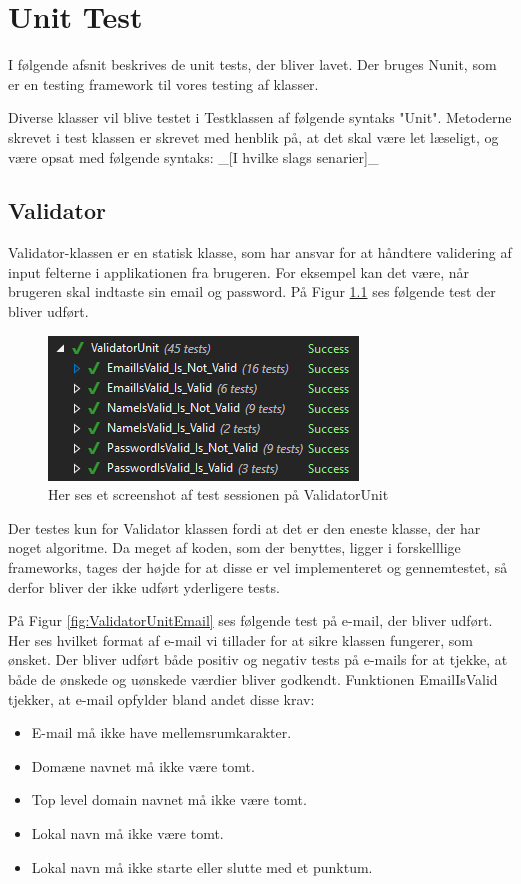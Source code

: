 \chapter{Unit Test}\label{sec:Unit}
I følgende afsnit beskrives de unit tests,  der bliver lavet. Der bruges Nunit\cite{NUnit}, som er en testing framework til vores testing af klasser. 

Diverse klasser vil blive testet i Testklassen af følgende syntaks "Unit". Metoderne skrevet i test klassen er skrevet med henblik på, at det skal være let læseligt, og være opsat med følgende syntaks: 
\_[I hvilke slags senarier]\_ 

\section{Validator}
Validator-klassen er en statisk klasse, som har ansvar for at håndtere validering af input felterne i applikationen fra brugeren. For eksempel kan det være, når brugeren skal indtaste sin email og password. På Figur \ref{fig:ValidatorUnit} ses følgende test der bliver udført.
\begin{figure}[H]
	\centering
	\includegraphics[width=0.6\linewidth]{Unit/ValidatorUnit.PNG}
	\caption{Her ses et screenshot af test sessionen på ValidatorUnit}
	\label{fig:ValidatorUnit}
\end{figure}
 Der testes kun for Validator klassen fordi at det er den eneste klasse, der har noget algoritme. Da meget af koden, som der benyttes, ligger i forskelllige frameworks, tages der højde for at disse er vel implementeret og gennemtestet, så derfor bliver der ikke udført yderligere tests. 
\clearpage

På Figur \ref{fig:ValidatorUnitEmail} ses følgende test på e-mail, der bliver udført. Her ses hvilket format af e-mail vi tillader for at sikre klassen fungerer, som ønsket.
Der bliver udført både positiv og negativ tests på e-mails for at tjekke, at både de ønskede og uønskede værdier bliver godkendt. Funktionen EmailIsValid tjekker, at e-mail opfylder bland andet disse krav:\\
\begin{itemize}
	\item E-mail må ikke have mellemsrumkarakter.
	\item Domæne navnet må ikke være tomt.
	\item Top level domain navnet\cite{TLD} må ikke være tomt.
	\item Lokal navn må ikke være tomt.
	\item Lokal navn må ikke starte eller slutte med et punktum.	
\end{itemize}

